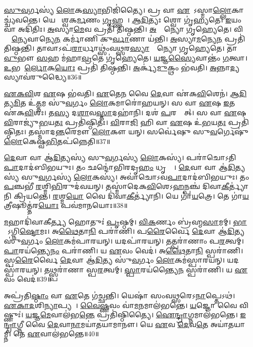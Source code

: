 \ul{𑌸𑍁}\ul{𑌵}𑌰𑍍𑌗𑌸𑍍𑌯॑ \ul{𑌲𑍋}𑌕\ul{𑌸𑍍𑌯𑌾}𑌭𑌿𑌜𑌿॑𑌤𑍍𑌯𑍈।
𑌪𑍍𑌰 𑌵𑌾 \ul{𑌏}𑌤𑍇᳚\-𑌽𑌸𑍍𑌮𑌾\ul{𑌲𑍍𑌲𑍋}𑌕𑌾𑌚𑍍𑌚𑍍𑌯॑𑌵𑌨𑍍𑌤𑍇।
𑌯𑍇 𑌵𑍈᳚𑌶𑍍𑌵𑌕\ul{𑌰𑍍𑌮}𑌣𑌂 \ul{𑌗𑍃}𑌹𑍍𑌣𑌤𑍇᳚।
\ul{𑌆}\ul{𑌦𑌿}𑌤𑍍𑌯𑌃 𑌶𑍍𑌵𑍋 𑌗𑍃॑𑌹𑍍𑌯𑌤𑍇।
\ul{𑌇}𑌯𑌂 𑌵𑌾 𑌅𑌦𑌿॑𑌤𑌿𑌃।
\ul{𑌅}𑌸𑍍𑌯𑌾\ul{𑌮𑍇}𑌵 𑌪𑍍𑌰𑌤𑌿॑ 𑌤𑌿𑌷𑍍𑌠𑌨𑍍𑌤𑌿।
\ul{𑌅}𑌨𑍍𑌯𑍋᳚𑌨𑍍𑌯𑍋 𑌗𑍃𑌹𑍍𑌯𑍇𑌤𑍇।
𑌵𑌿𑌶𑍍𑌵𑌾᳚\ul{𑌨𑍍𑌯𑍇}𑌵𑌾𑌨𑍍𑌯𑍇\ul{𑌨} 𑌕𑌰𑍍𑌮𑌾॑𑌣𑌿 𑌕𑍁\ul{𑌰𑍍𑌵𑌾}𑌣𑌾 𑌯॑𑌨𑍍𑌤𑌿।
\ul{𑌅}𑌸𑍍𑌯𑌾\ul{𑌮}𑌨𑍍𑌯𑍇\ul{𑌨} 𑌪𑍍𑌰𑌤𑌿॑ 𑌤𑌿𑌷𑍍𑌠𑌨𑍍𑌤𑌿।
𑌤𑌾𑌵𑌾𑌽𑌪॑\ul{𑌰𑌾}𑌰𑍍𑌧𑌾𑌥𑍍𑌸𑌂॑𑌵\ul{𑌥𑍍𑌸}𑌰\ul{𑌸𑍍𑌯𑌾}𑌨𑍍𑌯𑍋᳚𑌨𑍍𑌯𑍋 𑌗𑍃𑌹𑍍𑌯𑍇𑌤𑍇।
𑌤𑌾\ul{𑌵𑍁}𑌭𑍗 \ul{𑌸}𑌹 𑌮॑𑌹𑌾\ul{𑌵𑍍𑌰}𑌤𑍇 𑌗𑍃॑𑌹𑍍𑌯𑍇𑌤𑍇।
\ul{𑌯}𑌜𑍍𑌞\ul{𑌸𑍍𑌯𑍈}𑌵𑌾𑌨𑍍𑌤𑌂॑ \ul{𑌗}𑌤𑍍𑌵𑌾।
\ul{𑌉}𑌭𑌯𑍋᳚\ul{𑌰𑍍𑌲𑍋}𑌕\ul{𑌯𑍋𑌃} 𑌪𑍍𑌰𑌤𑌿॑ 𑌤𑌿𑌷𑍍𑌠𑌨𑍍𑌤𑌿।
\ul{𑌅}𑌰𑍍𑌕𑍍𑌯॑\ul{𑌮𑍁}𑌕𑍍𑌥𑌂 𑌭॑𑌵𑌤𑌿।
\ul{𑌅}𑌨𑍍𑌨𑌾\ul{𑌦𑍍𑌯}𑌸𑍍𑌯𑌾𑌵॑𑌰𑍁𑌦𑍍𑌧𑍍𑌯𑍈॥36॥\anuvakamend[\ul{𑌸}\ul{𑌮𑌾}𑌯𑌚𑍍𑌛॑𑌤𑍍𑌯𑌤𑌿\ul{𑌗𑍍𑌰𑌾}𑌹𑍍𑌯𑌾॑ 𑌗𑍃𑌹𑍍𑌯𑌨𑍍𑌤𑍇 \ul{𑌗𑍃}𑌹𑍍𑌯𑌤𑍇॑ 𑌸𑌂𑌵\ul{𑌥𑍍𑌸}𑌰\ul{𑌸𑍍𑌯𑌾}𑌨𑍍𑌯𑍋᳚𑌨𑍍𑌯𑍋 𑌗𑍃𑌹𑍍𑌯𑍇\ul{𑌤𑍇} 𑌪𑌞𑍍𑌚॑ 𑌚]

\ul{𑌏}\ul{𑌕}\ul{𑌵𑌿}\ul{}𑌶 \ul{𑌏}𑌷 𑌭॑𑌵𑌤𑌿।
\ul{𑌏}𑌤𑍇\ul{𑌨} 𑌵𑍈 \ul{𑌦𑍇}𑌵𑌾 𑌏॑𑌕\ul{𑌵𑌿}\ul{}𑌶𑍇𑌨॑।
\ul{𑌆}\ul{𑌦𑌿}𑌤𑍍𑌯\ul{𑌮𑌿}𑌤 𑌉॑\ul{𑌤𑍍𑌤}𑌮 𑌸𑍁॑\ul{𑌵}𑌰𑍍𑌗𑌂 \ul{𑌲𑍋}𑌕𑌮𑌾𑌰𑍋॑𑌹𑌯𑌨𑍍।
𑌸 𑌵𑌾 \ul{𑌏}𑌷 \ul{𑌇}𑌤 𑌏॑𑌕\ul{𑌵𑌿}\ul{}𑌶𑌃।
𑌤\ul{𑌸𑍍𑌯} 𑌦\ul{𑌶𑌾}𑌵\ul{𑌸𑍍𑌤𑌾}𑌦𑌹𑌾॑𑌨𑌿।
𑌦𑌶॑ \ul{𑌪}𑌰𑌸𑍍𑌤𑌾᳚𑌤𑍍।
𑌸 𑌵𑌾 \ul{𑌏}𑌷 \ul{𑌵𑌿}𑌰𑌾𑌜𑍍𑌯𑍁॑\ul{𑌭}𑌯\ul{𑌤𑌃} 𑌪𑍍𑌰𑌤𑌿॑\-𑌷𑍍𑌠𑌿𑌤𑌃।
\ul{𑌵𑌿}𑌰𑌾\ul{𑌜𑌿} 𑌹𑌿 𑌵𑌾 \ul{𑌏}𑌷 𑌉॑\ul{𑌭}𑌯\ul{𑌤𑌃} 𑌪𑍍𑌰𑌤𑌿॑\-𑌷𑍍𑌠𑌿𑌤𑌃।
𑌤𑌸𑍍𑌮𑌾॑𑌦\ul{𑌨𑍍𑌤}𑌰𑍇𑌮𑍗 \ul{𑌲𑍋}𑌕𑍗 𑌯𑌨𑍍।
𑌸𑌰𑍍𑌵𑍇॑𑌷𑍁 𑌸𑍁\ul{𑌵}𑌰𑍍𑌗𑍇𑌷𑍁॑ \ul{𑌲𑍋}𑌕𑍇𑌷𑍍𑌵॑\ul{𑌭𑌿}𑌤𑌪॑𑌨𑍍𑌨𑍇𑌤𑌿॥37॥

\ul{𑌦𑍇}𑌵𑌾 𑌵𑌾 𑌆॑\ul{𑌦𑌿}𑌤𑍍𑌯𑌸𑍍𑌯॑ 𑌸𑍁\ul{𑌵}𑌰𑍍𑌗𑌸𑍍𑌯॑ \ul{𑌲𑍋}𑌕𑌸𑍍𑌯॑।
𑌪𑌰𑌾॑𑌚𑍋\-𑌽𑌤𑌿\ul{𑌪𑌾}𑌦𑌾\-𑌦॑𑌬𑌿𑌭𑌯𑍁𑌃।
𑌤𑌂 𑌛𑌨𑍍𑌦𑍋॑𑌭𑌿𑌰𑌦𑍃\ul{𑌹𑌂} 𑌧𑍃𑌤𑍍𑌯𑍈᳚।
\ul{𑌦𑍇}𑌵𑌾 𑌵𑌾 𑌆॑\ul{𑌦𑌿}𑌤𑍍𑌯𑌸𑍍𑌯॑ 𑌸𑍁\ul{𑌵}𑌰𑍍𑌗𑌸𑍍𑌯॑ \ul{𑌲𑍋}𑌕𑌸𑍍𑌯॑।
𑌅𑌵𑌾॑𑌚𑍋\-𑌽𑌵\ul{𑌪𑌾}𑌦𑌾𑌦॑𑌬𑌿𑌭𑌯𑍁𑌃।
𑌤𑌂 \ul{𑌪}𑌞𑍍𑌚𑌭𑍀॑ \ul{𑌰}𑌶𑍍𑌮𑌿\ul{𑌭𑌿}𑌰𑍁𑌦॑𑌵𑌯𑌨𑍍।
𑌤𑌸𑍍𑌮𑌾॑𑌦𑍇𑌕\ul{𑌵𑌿}\ul{}𑌶𑍇\-𑌽\ul{𑌹}𑌨𑍍𑌪𑌞𑍍𑌚॑ 𑌦𑌿𑌵𑌾\ul{𑌕𑍀}𑌰𑍍𑌤𑍍𑌯𑌾॑𑌨𑌿 𑌕𑍍𑌰𑌿𑌯𑌨𑍍𑌤𑍇।
\ul{𑌰}𑌶𑍍𑌮\ul{𑌯𑍋} 𑌵𑍈 𑌦𑌿॑𑌵𑌾\ul{𑌕𑍀}𑌰𑍍𑌤𑍍𑌯𑌾॑𑌨𑌿।
𑌯𑍇 𑌗𑌾॑\ul{𑌯}𑌤𑍍𑌰𑍇।
𑌤𑍇 𑌗𑌾॑\ul{𑌯}𑌤𑍍𑌰𑍀𑌷𑍂𑌤𑍍𑌤॑𑌰\ul{𑌯𑍋𑌃} 𑌪𑌵॑𑌮𑌾𑌨𑌯𑍋𑌃॥38॥

\ul{𑌮}𑌹𑌾𑌦𑌿॑𑌵𑌾𑌕𑍀\ul{𑌰𑍍𑌤𑍍𑌯}\ul{} 𑌹𑍋𑌤𑍁𑌃॑ \ul{𑌪𑍃}𑌷𑍍𑌠𑌮𑍍।
\ul{𑌵𑌿}\ul{𑌕}𑌰𑍍𑌣𑌂 𑌬𑍍𑌰॑𑌹𑍍𑌮\ul{𑌸𑌾}𑌮𑌮𑍍।
\ul{𑌭𑌾}𑌸𑍋᳚\-𑌽𑌗𑍍𑌨𑌿\ul{𑌷𑍍𑌟𑍋}𑌮𑌃।
𑌅\ul{𑌥𑍈}𑌤𑌾\ul{𑌨𑌿} 𑌪𑌰𑌾॑𑌣𑌿।
𑌪\ul{𑌰𑍈}𑌰𑍍𑌵𑍈 \ul{𑌦𑍇}𑌵𑌾 𑌆॑\ul{𑌦𑌿}𑌤𑍍𑌯 𑌸𑍁॑\ul{𑌵}𑌰𑍍𑌗𑌂 \ul{𑌲𑍋}𑌕𑌮॑𑌪𑌾𑌰𑌯𑌨𑍍।
𑌯𑌦𑌪𑌾॑𑌰𑌯𑌨𑍍।
𑌤𑌤𑍍𑌪𑌰𑌾॑𑌣𑌾𑌂 𑌪\ul{𑌰}𑌤𑍍𑌵𑌮𑍍।
\ul{𑌪𑌾}𑌰𑌯॑𑌨𑍍𑌤𑍍𑌯𑍇\ul{𑌨𑌂} 𑌪𑌰𑌾॑𑌣𑌿।
𑌯 \ul{𑌏}𑌵𑌂 𑌵𑍇𑌦॑।
𑌅\ul{𑌥𑍈}𑌤𑌾\ul{𑌨𑌿} 𑌸𑍍𑌪𑌰𑌾॑𑌣𑌿।
𑌸𑍍𑌪\ul{𑌰𑍈}𑌰𑍍𑌵𑍈 \ul{𑌦𑍇}𑌵𑌾 𑌆॑\ul{𑌦𑌿}𑌤𑍍𑌯 𑌸𑍁॑\ul{𑌵}𑌰𑍍𑌗𑌂 \ul{𑌲𑍋}𑌕𑌮॑𑌸𑍍𑌪𑌾𑌰𑌯𑌨𑍍।
𑌯𑌦𑌸𑍍𑌪𑌾॑𑌰𑌯𑌨𑍍।
𑌤𑌥𑍍𑌸𑍍𑌪𑌰𑌾॑𑌣𑌾 𑌸𑍍𑌪\ul{𑌰}𑌤𑍍𑌵𑌮𑍍।
\ul{𑌸𑍍𑌪𑌾}𑌰𑌯॑𑌨𑍍𑌤𑍍𑌯𑍈\ul{𑌨}\ul{} 𑌸𑍍𑌪𑌰𑌾॑𑌣𑌿।
𑌯 \ul{𑌏}𑌵𑌂 𑌵𑍇𑌦॑॥39॥\anuvakamend[\ul{𑌏}\ul{𑌤𑌿} 𑌪𑌵॑𑌮𑌾𑌨\ul{𑌯𑍋𑌃} 𑌸𑍍𑌪𑌰𑌾॑\ul{𑌣𑌿} 𑌪𑌞𑍍𑌚॑ 𑌚]

𑌅𑌪𑍍𑌰॑𑌤𑌿\ul{𑌷𑍍𑌠𑌾𑌂} 𑌵𑌾 \ul{𑌏}𑌤𑍇 𑌗॑𑌚𑍍𑌛𑌨𑍍𑌤𑌿।
𑌯𑍇𑌷𑌾॑ 𑌸𑌂𑌵\ul{𑌥𑍍𑌸}𑌰𑍇\-𑌽\ul{𑌨𑌾}𑌪𑍍𑌤𑍇𑌽𑌥॑।
\ul{𑌏}\ul{𑌕𑌾}\ul{𑌦}𑌶𑌿\ul{𑌨𑍍𑌯𑌾}𑌪𑍍𑌯𑌤𑍇᳚।
\ul{𑌵𑍈}\ul{𑌷𑍍𑌣}𑌵𑌂 𑌵𑌾॑\ul{𑌮}𑌨𑌮𑌾𑌲॑𑌭𑌨𑍍𑌤𑍇।
\ul{𑌯}𑌜𑍍𑌞𑍋 𑌵𑍈 𑌵𑌿𑌷𑍍𑌣𑍁𑌃॑।
\ul{𑌯}𑌜𑍍𑌞\ul{𑌮𑍇}𑌵𑌾𑌲॑𑌭\ul{𑌨𑍍𑌤𑍇} 𑌪𑍍𑌰𑌤𑌿॑\-𑌷𑍍𑌠𑌿𑌤𑍍𑌯𑍈।
\ul{𑌐}\ul{𑌨𑍍𑌦𑍍𑌰𑌾}𑌗𑍍𑌨𑌮𑌾𑌲॑𑌭𑌨𑍍𑌤𑍇।
\ul{𑌇}\ul{𑌨𑍍𑌦𑍍𑌰𑌾}𑌗𑍍𑌨𑍀 𑌵𑍈 \ul{𑌦𑍇}𑌵𑌾\ul{𑌨𑌾}𑌮𑌯𑌾॑𑌤𑌯𑌾𑌮𑌾𑌨𑍗।
𑌯𑍇 \ul{𑌏}𑌵 \ul{𑌦𑍇}𑌵\ul{𑌤𑍇} 𑌅𑌯𑌾॑𑌤𑌯𑌾𑌮𑍍𑌨𑍀।
𑌤𑍇 \ul{𑌏}𑌵𑌾𑌲॑𑌭𑌨𑍍𑌤𑍇॥40॥

